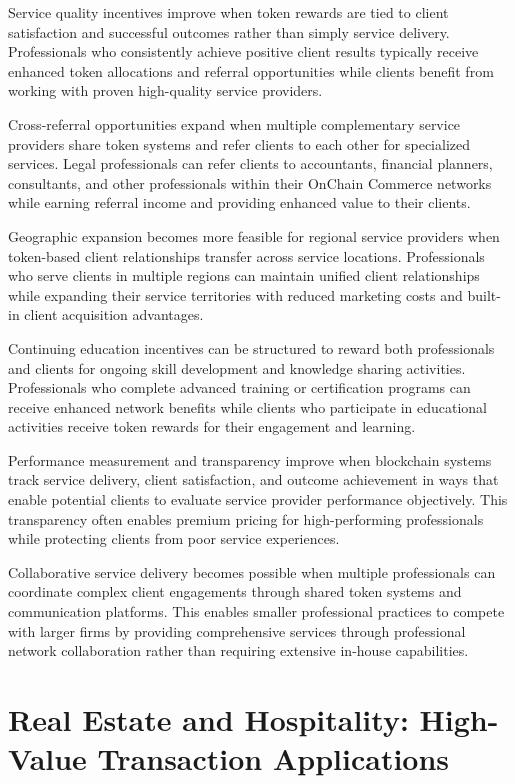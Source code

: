 \documentclass[
  Letterpaper,
]{scrbook}
\begin{document}
Service quality incentives improve when token rewards are tied to client
satisfaction and successful outcomes rather than simply service
delivery. Professionals who consistently achieve positive client results
typically receive enhanced token allocations and referral opportunities
while clients benefit from working with proven high-quality service
providers.

Cross-referral opportunities expand when multiple complementary service
providers share token systems and refer clients to each other for
specialized services. Legal professionals can refer clients to
accountants, financial planners, consultants, and other professionals
within their OnChain Commerce networks while earning referral income and
providing enhanced value to their clients.

Geographic expansion becomes more feasible for regional service
providers when token-based client relationships transfer across service
locations. Professionals who serve clients in multiple regions can
maintain unified client relationships while expanding their service
territories with reduced marketing costs and built-in client acquisition
advantages.

Continuing education incentives can be structured to reward both
professionals and clients for ongoing skill development and knowledge
sharing activities. Professionals who complete advanced training or
certification programs can receive enhanced network benefits while
clients who participate in educational activities receive token rewards
for their engagement and learning.

Performance measurement and transparency improve when blockchain systems
track service delivery, client satisfaction, and outcome achievement in
ways that enable potential clients to evaluate service provider
performance objectively. This transparency often enables premium pricing
for high-performing professionals while protecting clients from poor
service experiences.

Collaborative service delivery becomes possible when multiple
professionals can coordinate complex client engagements through shared
token systems and communication platforms. This enables smaller
professional practices to compete with larger firms by providing
comprehensive services through professional network collaboration rather
than requiring extensive in-house capabilities.

\section{Real Estate and Hospitality: High-Value Transaction
Applications}\label{real-estate-and-hospitality-high-value-transaction-applications}
\end{document}
